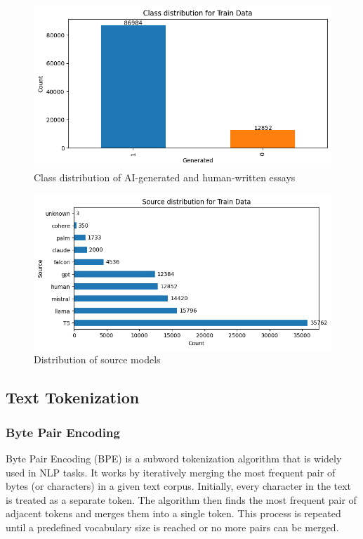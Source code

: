 \documentclass[conference]{IEEEtran}
\begin{document}
\begin{figure}[htbp]
  \centerline{\includegraphics[width=\columnwidth]{figs/class_dist.png}}
  \caption{Class distribution of AI-generated and human-written essays}
  \label{fig:class_dist}
\end{figure}

\begin{figure}[htbp]
  \centerline{\includegraphics[width=\columnwidth]{figs/source_dist.png}}
  \caption{Distribution of source models}
  \label{fig:source_dist}
\end{figure}

\subsection{Text Tokenization}

\subsubsection{Byte Pair Encoding}

Byte Pair Encoding (BPE) is a subword tokenization algorithm that is widely used in NLP tasks. It works by iteratively merging the most frequent pair of bytes (or characters) in a given text corpus. Initially, every character in the text is treated as a separate token. The algorithm then finds the most frequent pair of adjacent tokens and merges them into a single token. This process is repeated until a predefined vocabulary size is reached or no more pairs can be merged.
\end{document}
